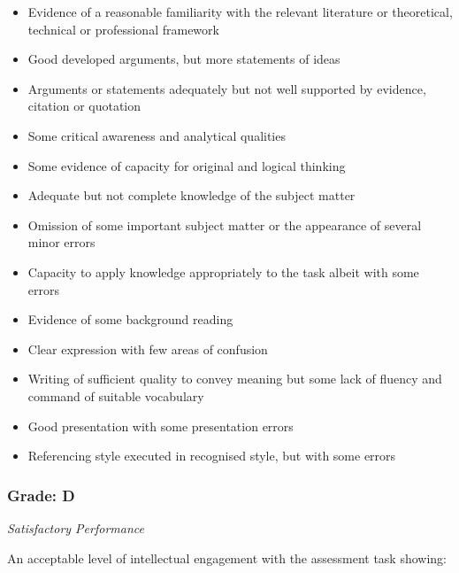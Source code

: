 \begin{itemize}
	\item Evidence of a reasonable familiarity with the relevant literature or theoretical, technical or professional framework
	\item Good developed arguments, but more statements of ideas
	\item Arguments or statements adequately but not well supported by evidence, citation or quotation
	\item Some critical awareness and analytical qualities
	\item Some evidence of capacity for original and logical thinking
	\item Adequate but not complete
	knowledge of the subject matter
	\item Omission of some important subject matter or the appearance of several minor errors
	\item Capacity to apply knowledge appropriately to the task albeit with some errors
	\item Evidence of some background reading
	\item Clear expression with few areas of confusion
	\item Writing of sufficient quality to convey meaning but some lack of fluency and command of suitable vocabulary
	\item Good presentation with some presentation errors
	\item Referencing style executed in recognised style, but with some errors
\end{itemize}


\subsubsection*{Grade: D}

\textit{Satisfactory Performance}

An acceptable level of intellectual engagement with the assessment task showing:


